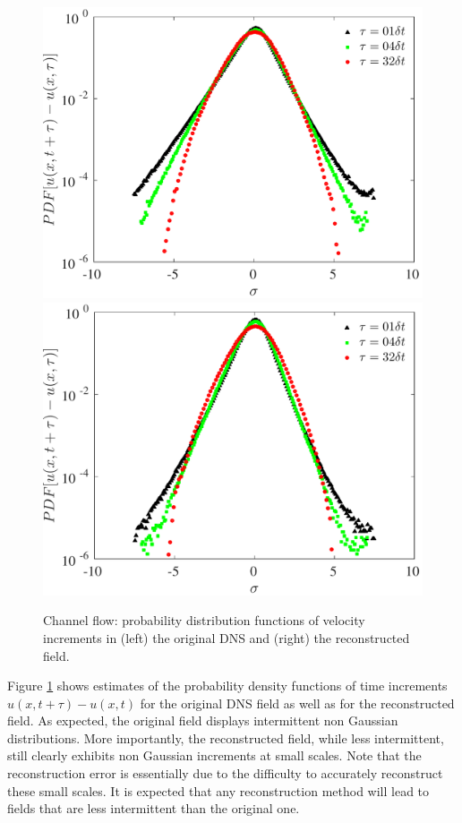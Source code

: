 \begin{figure}
\begin{center}
\includegraphics[width=0.49\columnwidth]{./images/comparisons/channel/pdf_org}
\includegraphics[width=0.49\columnwidth]{./images/comparisons/channel/pdf_fusion}
\caption{\label{fig:final_channel_pdf} Channel flow: probability distribution functions of velocity increments in (left) the original DNS and (right) the reconstructed field.}
\end{center}
\end{figure}

Figure \ref{fig:final_channel_pdf} shows estimates of the probability density functions of time increments $u(x,t+\tau)-u(x,t)$ for the original DNS field as well as for the reconstructed field. As expected, the original field displays intermittent non Gaussian distributions. More importantly, the reconstructed field, while less intermittent, still clearly exhibits non Gaussian increments at small scales. Note that the reconstruction error is essentially due to the difficulty to accurately reconstruct these small scales. It is expected that any reconstruction method will lead to fields that are less intermittent than the original one.

